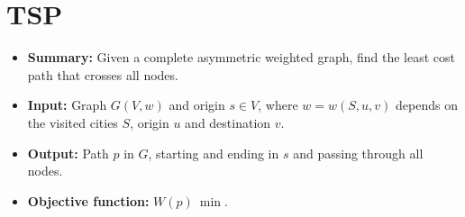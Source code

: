 \section{\texorpdfstring{\Acrlong*{TSP}}{Travelling salesman problem}} \label{algorithm-tsp}
\begin{itemize}
    \item \textbf{Summary:} Given a complete asymmetric weighted graph, find the least cost path that crosses all nodes. 
    \item \textbf{Input:} Graph $G(V,w)$ and origin $s \in V$, where $w=w(S, u, v)$ depends on the visited cities $S$, origin $u$ and destination $v$.
    \item \textbf{Output:} Path $p$ in $G$, starting and ending in $s$ and passing through all nodes.
    \item \textbf{Objective function:} $W(p)~\min$.
\end{itemize}


